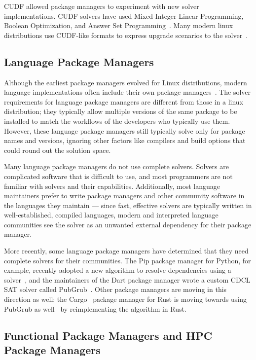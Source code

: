 CUDF allowed package managers to experiment with new solver implementations.
CUDF solvers have used Mixed-Integer Linear Programming, Boolean Optimization, and Answer Set Programming~\cite{michel+:lococo2010,argelich+:lococo2010,gebser+:2011-aspcud}.
Many modern linux distributions use CUDF-like formats to express upgrade scenarios to the solver~\cite{abate2020dependency}.

\subsection{Language Package Managers}

Although the earliest package managers evolved for Linux distributions, modern language implementations often include their own package managers~\cite{npm,pip,cargo,weizenbaum:pubgrub18}.
The solver requirements for language package managers are different from those in a linux distribution; they typically allow multiple versions of the same package to be installed to match the workflows of the developers who typically use them.
However, these language package managers still typically solve only for package names and versions, ignoring other factors like compilers and build options that could round out the solution space.

Many language package managers do not use complete solvers.
Solvers are complicated software that is difficult to use, and most programmers are not familiar with solvers and their capabilities.
Additionally, most language maintainers prefer to write package managers and other community software in the languages they maintain --- since fast, effective solvers are typically written in well-established, compiled languages, modern and interpreted language communities see the solver as an unwanted external dependency for their package manager.

More recently, some language package managers have determined that they need complete solvers for their communities. The Pip package manager for Python, for example, recently adopted a new algorithm to resolve dependencies using a solver~\cite{pip-new-resolver}, and the maintainers of the Dart package manager wrote a custom CDCL SAT solver called PubGrub~\cite{weizenbaum:pubgrub18}.
Other package managers are moving in this direction as well; the Cargo~\cite{cargo} package manager for Rust is moving towards using PubGrub as well~\cite{pubgrub-rs} by reimplementing the algorithm in Rust.

\subsection{Functional Package Managers and HPC Package Managers}

